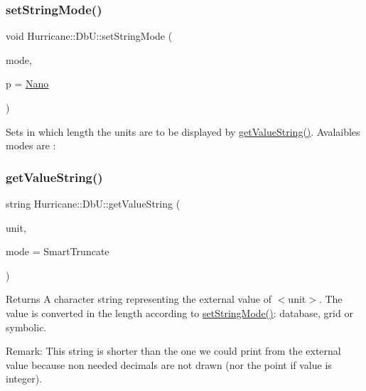 \subsubsection{\texorpdfstring{set\+String\+Mode()}{setStringMode()}}
{\footnotesize\ttfamily void Hurricane\+::\+Db\+U\+::set\+String\+Mode (\begin{DoxyParamCaption}\item[{unsigned int}]{mode,  }\item[{\mbox{\hyperlink{group__DbUGroup_ga50b5785bf4d75026c4c112caec3040a7}{Unit\+Power}}}]{p = {\ttfamily \mbox{\hyperlink{group__DbUGroup_gga50b5785bf4d75026c4c112caec3040a7a03e5923be5810db830626f2ca26319d6}{Nano}}} }\end{DoxyParamCaption})\hspace{0.3cm}{\ttfamily [static]}}

Sets in which length the units are to be displayed by \mbox{\hyperlink{group__DbUGroup_gadc9c1a06b4296dbddcf711077113f4bd}{get\+Value\+String()}}. Avalaibles modes are \+: \mbox{\label{group__DbUGroup_gadc9c1a06b4296dbddcf711077113f4bd}} 
\subsubsection{\texorpdfstring{get\+Value\+String()}{getValueString()}}
{\footnotesize\ttfamily string Hurricane\+::\+Db\+U\+::get\+Value\+String (\begin{DoxyParamCaption}\item[{\mbox{\hyperlink{group__DbUGroup_ga4fbfa3e8c89347af76c9628ea06c4146}{Unit}}}]{unit,  }\item[{int}]{mode = {\ttfamily SmartTruncate} }\end{DoxyParamCaption})\hspace{0.3cm}{\ttfamily [static]}}

\begin{DoxyReturn}{Returns}
A character string representing the external value of {\ttfamily $<$unit$>$}. The value is converted in the length according to \mbox{\hyperlink{group__DbUGroup_ga89ab8f8326c54113336086663ecf1d25}{set\+String\+Mode()}}\+: database, grid or symbolic.
\end{DoxyReturn}
\begin{DoxyParagraph}{Remark\+: This string is shorter than the one we could print from the }
external value because non needed decimals are not drawn (nor the point if value is integer). 
\end{DoxyParagraph}
\mbox{\label{group__DbUGroup_gace9a8644e7e80dcaed2a8a95deeb1622}} 
